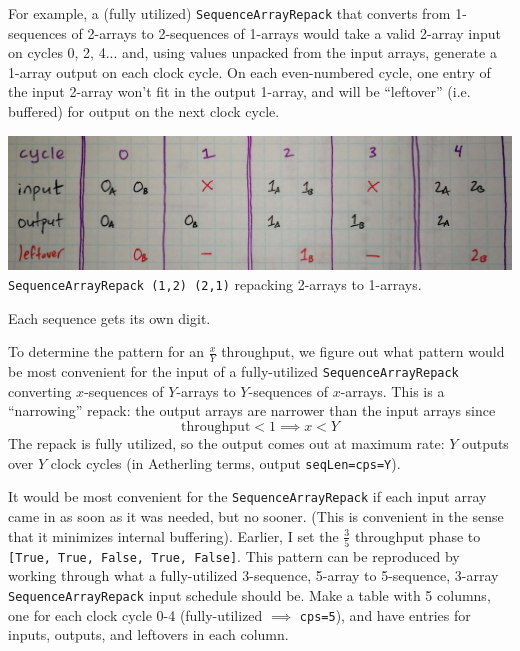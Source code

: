 \documentclass[12pt]{article}
\begin{document}
For example, a (fully utilized) \texttt{SequenceArrayRepack} that
converts from 1-sequences of 2-arrays to 2-sequences of 1-arrays would
take a valid 2-array input on cycles 0, 2, 4... and, using values
unpacked from the input arrays, generate a 1-array output on each
clock cycle.  On each even-numbered cycle, one entry of the input
2-array won't fit in the output 1-array, and will be ``leftover''
(i.e. buffered) for output on the next clock cycle.

\begin{center}
\includegraphics[width=1.0\linewidth]{Figures/repack.jpg}
\texttt{SequenceArrayRepack (1,2) (2,1)} repacking 2-arrays to 1-arrays.

Each sequence gets its own digit.
\end{center}

To determine the pattern for an $\frac{x}{Y}$ throughput, we figure
out what pattern would be most convenient for the input of a
fully-utilized \texttt{SequenceArrayRepack} converting $x$-sequences
of $Y$-arrays to $Y$-sequences of $x$-arrays. This is a ``narrowing''
repack: the output arrays are narrower than the input arrays since
\begin{equation*}
    \text{throughput}<1 \implies x<Y
\end{equation*}
The repack is fully utilized, so the output comes
out at maximum rate: $Y$ outputs over $Y$ clock cycles (in Aetherling
terms, output \texttt{seqLen=cps=Y}).

It would be most convenient for the \texttt{SequenceArrayRepack} if
each input array came in as soon as it was needed, but no sooner.
(This is convenient in the sense that it minimizes internal
buffering). Earlier, I set the $\frac{3}{5}$ throughput phase to
\texttt{[True, True, False, True, False]}. This pattern can be
reproduced by working through what a fully-utilized 3-sequence,
5-array to 5-sequence, 3-array \texttt{SequenceArrayRepack} input
schedule should be. Make a table with 5 columns, one for each clock
cycle 0-4 (fully-utilized $\implies$ \texttt{cps=5}), and have entries
for inputs, outputs, and leftovers in each column.
\end{document}
